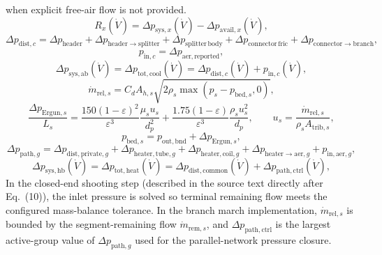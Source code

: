 \documentclass[11pt]{article}
\begin{document}
when explicit free-air flow is not provided.
\begin{equation}
R_x(\dot V)=\Delta p_{\mathrm{sys},x}(\dot V)-\Delta p_{\mathrm{avail},x}(\dot V),
\tag{18.5C-1b}
\end{equation}
\begin{equation}
\Delta p_{\mathrm{dist},c}
=
\Delta p_{\mathrm{header}}
+\Delta p_{\mathrm{header\rightarrow splitter}}
+\Delta p_{\mathrm{splitter\,body}}
+\Delta p_{\mathrm{connector\,fric}}
+\Delta p_{\mathrm{connector\rightarrow branch}},
\tag{56}
\end{equation}
\begin{equation}
p_{\mathrm{in},c}=\Delta p_{\mathrm{aer,reported}},
\tag{18.5C-1b0}
\end{equation}
\begin{equation}
\Delta p_{\mathrm{sys},\mathrm{ab}}(\dot V)=\Delta p_{\mathrm{tot,cool}}(\dot V)=\Delta p_{\mathrm{dist},c}(\dot V)+p_{\mathrm{in},c}(\dot V),
\tag{76}
\end{equation}
\begin{equation}
\dot m_{\mathrm{rel},s}=C_dA_{h,s}\sqrt{2\rho_s\max(p_s-p_{\mathrm{bed},s},0)},
\tag{15}
\end{equation}
\begin{equation}
\frac{\Delta p_{\mathrm{Ergun},s}}{L_s}
=
\frac{150(1-\varepsilon)^2}{\varepsilon^3}\frac{\mu_su_s}{d_p^2}
+
\frac{1.75(1-\varepsilon)}{\varepsilon^3}\frac{\rho_su_s^2}{d_p},
\qquad
u_s=\frac{\dot m_{\mathrm{rel},s}}{\rho_sA_{\mathrm{trib},s}},
\tag{62}
\end{equation}
\begin{equation}
p_{\mathrm{bed},s}=p_{\mathrm{out,bnd}}+\Delta p_{\mathrm{Ergun},s},
\tag{60}
\end{equation}
\begin{equation}
\Delta p_{\mathrm{path},g}
=
\Delta p_{\mathrm{dist,private},g}
+
\Delta p_{\mathrm{heater,tube},g}
+
\Delta p_{\mathrm{heater,coil},g}
+
\Delta p_{\mathrm{heater\rightarrow aer},g}
+
p_{\mathrm{in,aer},g},
\tag{80}
\end{equation}
\begin{equation}
\Delta p_{\mathrm{sys},\mathrm{hb}}(\dot V)=\Delta p_{\mathrm{tot,heat}}(\dot V)=\Delta p_{\mathrm{dist,common}}(\dot V)+\Delta p_{\mathrm{path,ctrl}}(\dot V),
\tag{81}
\end{equation}
In the closed-end shooting step (described in the source text directly after Eq.~(10)), the inlet pressure is solved so terminal remaining flow meets the configured mass-balance tolerance. In the branch march implementation, \(\dot m_{\mathrm{rel},s}\) is bounded by the segment-remaining flow \(\dot m_{\mathrm{rem},s}\), and \(\Delta p_{\mathrm{path,ctrl}}\) is the largest active-group value of \(\Delta p_{\mathrm{path},g}\) used for the parallel-network pressure closure.
\end{document}
